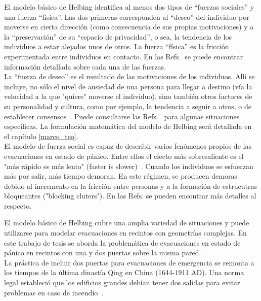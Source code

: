 \noindent El modelo básico de Helbing identifica al menos dos tipos de “fuerzas sociales” y una fuerza “física”.  Las dos primeras corresponden al “deseo” del individuo por moverse en cierta dirección (como consecuencia de sus propias motivaciones) y a la “preservación” de su “espacio de privacidad”, o sea, la tendencia de los individuos a estar alejados unos de otros. La fuerza “física” es la  fricción experimentada entre individuos en contacto. En las Refs~\cite{Helbing1,Dorso1,Dorso3} se puede encontrar información detallada sobre cada una de las fuerzas.\\ 

\noindent La “fuerza de deseo” es el resultado de las motivaciones de los individuos. Allí se incluye, no sólo el nivel de ansiedad de una persona para llegar a destino (vía la velocidad a la que "quiere" moverse el individuo), sino también otros factores de su personalidad y cultura, como por ejemplo, la tendencia a seguir a otros, o de establecer consensos~\cite{Dorso3,Dorso4}.  Puede consultarse las Refs.~\cite{Wang,low} para algunas situaciones específicas. 
La formulación matemática del modelo de Helbing será detallada en el capítulo \ref{marco_teo}. \\ 

El modelo de fuerza social es capaz de describir varios fenómenos propios de las evacuaciones en estado de pánico. Entre ellos el efecto más sobresaliente es el "más rápido es más lento" (faster is slower)~\cite{Helbing1}. Cuando los individuos se esfuerzan más por salir, más tiempo demoran. En este régimen, se producen demoras debido al incremento en la fricción entre personas y a la formación de estrucutras bloqueantes ("blocking cluters"). En las Refs. \cite{Dorso1} se pueden encontrar más detalles al respecto.

\noindent El modelo básico de Helbing cubre una amplia variedad de situaciones y puede utilizarse para modelar evacuaciones en recintos con geometrías complejas. En este trabajo de tesis se aborda la problemática de evacuaciones en estado de pánico en recintos con una y dos puertas sobre la misma pared.\\ 

\noindent La práctica de incluir dos puertas para evacuaciones de emergencia se remonta a los tiempos de la última dinastía Qing en China (1644-1911 AD). Una norma legal estableció que los edificios grandes debían tener dos salidas para evitar problemas en caso de incendio~\cite{cheng}.\\

